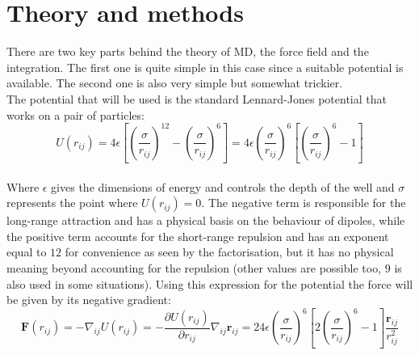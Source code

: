 \documentclass[11pt,a4paper,oneside]{article}
\begin{document}
	\section{Theory and methods}
	
		There are two key parts behind the theory of MD, the force field and the integration. The first one is quite simple in this case since a suitable potential is available. The second one is also very simple but somewhat trickier.\\
		
		The potential that will be used is the standard Lennard-Jones potential that works on a pair of particles:\\
		
		\begin{equation*}U\left(r_{ij}\right)=4\epsilon\left[\left(\frac{\sigma}{r_{ij}}\right)^{12}-\left(\frac{\sigma}{r_{ij}}\right)^6\right]=4\epsilon\left(\frac{\sigma}{r_{ij}}\right)^6\left[\left(\frac{\sigma}{r_{ij}}\right)^6-1\right]\end{equation*}\\
		
		Where $\epsilon$ gives the dimensions of energy and controls the depth of the well and $\sigma$ represents the point where $U\left(r_{ij}\right)=0$. The negative term is responsible for the long-range attraction and has a physical basis on the behaviour of dipoles, while the positive term accounts for the short-range repulsion and has an exponent equal to $12$ for convenience as seen by the factorisation, but it has no physical meaning beyond accounting for the repulsion (other values are possible too, $9$ is also used in some situations). Using this expression for the potential the force will be given by its negative gradient:\\
		
		\begin{equation*}\mathbf{F}\left(r_{ij}\right)=-\nabla_{ij}U\left(r_{ij}\right)=-\frac{\partial U\left(r_{ij}\right)}{\partial r_{ij}}\nabla_{ij}\mathbf{r}_{ij}=24\epsilon\left(\frac{\sigma}{r_{ij}}\right)^6\left[2\left(\frac{\sigma}{r_{ij}}\right)^6-1\right]\frac{\mathbf{r}_{ij}}{r_{ij}^2}\end{equation*}\\
		
\end{document}
